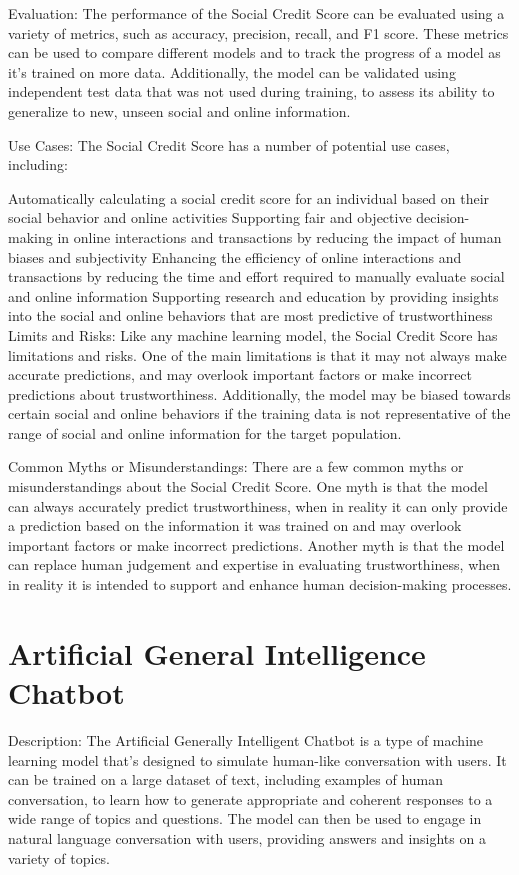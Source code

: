 Evaluation:
The performance of the Social Credit Score can be evaluated using a variety of metrics, such as accuracy, precision, recall, and F1 score. These metrics can be used to compare different models and to track the progress of a model as it's trained on more data. Additionally, the model can be validated using independent test data that was not used during training, to assess its ability to generalize to new, unseen social and online information.

Use Cases:
The Social Credit Score has a number of potential use cases, including:

Automatically calculating a social credit score for an individual based on their social behavior and online activities
Supporting fair and objective decision-making in online interactions and transactions by reducing the impact of human biases and subjectivity
Enhancing the efficiency of online interactions and transactions by reducing the time and effort required to manually evaluate social and online information
Supporting research and education by providing insights into the social and online behaviors that are most predictive of trustworthiness
Limits and Risks:
Like any machine learning model, the Social Credit Score has limitations and risks. One of the main limitations is that it may not always make accurate predictions, and may overlook important factors or make incorrect predictions about trustworthiness. Additionally, the model may be biased towards certain social and online behaviors if the training data is not representative of the range of social and online information for the target population.

Common Myths or Misunderstandings:
There are a few common myths or misunderstandings about the Social Credit Score. One myth is that the model can always accurately predict trustworthiness, when in reality it can only provide a prediction based on the information it was trained on and may overlook important factors or make incorrect predictions. Another myth is that the model can replace human judgement and expertise in evaluating trustworthiness, when in reality it is intended to support and enhance human decision-making processes.

\section{Artificial General Intelligence Chatbot}

Description:
The Artificial Generally Intelligent Chatbot is a type of machine learning model that's designed to simulate human-like conversation with users. It can be trained on a large dataset of text, including examples of human conversation, to learn how to generate appropriate and coherent responses to a wide range of topics and questions. The model can then be used to engage in natural language conversation with users, providing answers and insights on a variety of topics.

